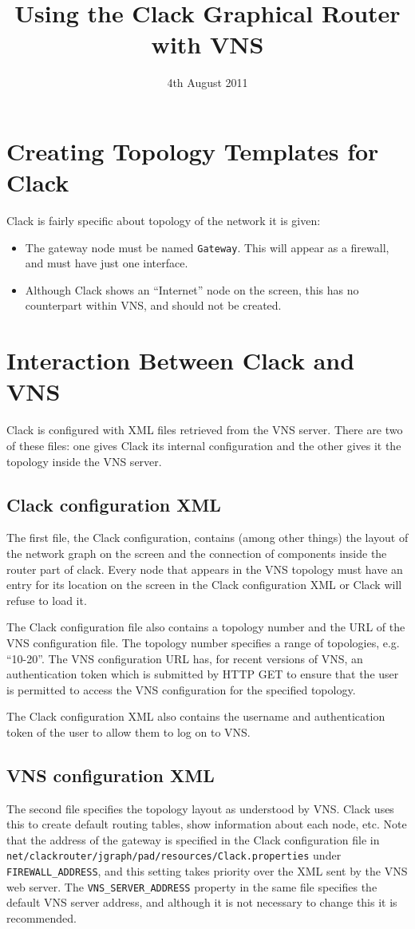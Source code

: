 \documentclass[a4paper,12pt]{article}
\begin{document}
\title{Using the Clack Graphical Router with VNS}
\date{4th August 2011}

\section{Creating Topology Templates for Clack}
Clack is fairly specific about topology of the network it is given:
\begin{itemize}
\item The gateway node must be named \texttt{Gateway}.  This will appear as a
firewall, and must have just one interface.
\item Although Clack shows an ``Internet'' node on the screen, this has no
counterpart within VNS, and should not be created.
\end{itemize}

\section{Interaction Between Clack and VNS}
Clack is configured with XML files retrieved from the VNS server.  There are two
of these files: one gives Clack its internal configuration and the other gives
it the topology inside the VNS server.

\subsection{Clack configuration XML}
The first file, the Clack configuration, contains (among other things) the
layout of the network graph on the screen and the connection of components
inside the router part of clack.  Every node that appears in the VNS topology
must have an entry for its location on the screen in the Clack configuration
XML or Clack will refuse to load it.

The Clack configuration file also contains a topology number and the URL of the
VNS configuration file.  The topology number specifies a range of topologies,
e.g. ``10-20''.  The VNS configuration URL has, for recent versions of VNS, an
authentication token which is submitted by HTTP GET to ensure that the user is
permitted to access the VNS configuration for the specified topology.

The Clack configuration XML also contains the username and authentication token
of the user to allow them to log on to VNS.

\subsection{VNS configuration XML}
The second file specifies the topology layout as understood by VNS.  Clack uses
this to create default routing tables, show information about each node, etc.
Note that the address of the gateway is specified in the Clack configuration
file in \texttt{net/clackrouter/jgraph/pad/resources/Clack.properties} under
\texttt{FIREWALL\_ADDRESS}, and this setting takes priority over the XML sent by
the VNS web server.  The \texttt{VNS\_SERVER\_ADDRESS} property in the same file
specifies the default VNS server address, and although it is not necessary to
change this it is recommended.
\end{document}
